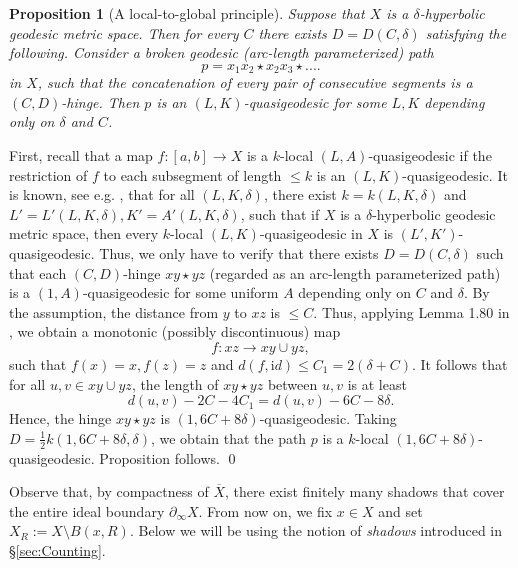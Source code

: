 \documentclass[12pt]{amsbook}%
\newtheorem{prop}[thm]{Proposition}
\theoremstyle{definition}
\newtheorem{defi}[thm]{Definition}
\theoremstyle{remark}
\numberwithin{section}{chapter}
\numberwithin{subsection}{section}
\numberwithin{figure}{chapter}
\def\geo{\partial_\infty}
\def\id{\mathrm id}
\def\ol{\overline}
\begin{document}
{{\begin{prop}
[A local-to-global principle]\label{P1}
Suppose that $X$ is a $\delta$-hyperbolic geodesic metric space. Then for every $C$ there exists $D=D(C,\delta)$ satisfying the following. Consider a broken geodesic (arc-length parameterized) 
path 
$$
p= x_1x_2 \star x_2 x_3 \star ....
$$
in $X$, such that the concatenation of every pair of consecutive segments is a $(C,D)$-hinge. Then $p$ is an $(L, K)$-quasigeodesic for some $L, K$ depending only on $\delta$ and $C$. 
\end{prop}
\proof First, recall that a map $f: [a,b]\to X$ is a $k$-local $(L,A)$-quasigeodesic if the restriction of $f$ to each subsegment of length $\leqslant k$ is an $(L,K)$-quasigeodesic. It is known, see e.g. \cite{CDP}, that for all $(L,K, \delta)$, there exist $k=k(L,K,\delta)$ and $L'=L'(L,K,\delta), K'=A'(L,K,\delta)$, such that if $X$ is a $\delta$-hyperbolic geodesic metric space, then every $k$-local $(L,K)$-quasigeodesic in $X$ is $(L',K')$-quasigeodesic. Thus, we only have to verify that there exists $D=D(C,\delta)$ such that each $(C,D)$-hinge $xy\star yz$ (regarded as an arc-length parameterized path) is a $(1,A)$-quasigeodesic for some uniform $A$ depending only on $C$ and $\delta$. By the assumption, the distance from $y$ to $xz$ is $\leqslant C$. Thus, applying Lemma 1.80 in \cite{Kapovich-Sardar}, we obtain a monotonic (possibly discontinuous) map 
$$
f: xz\to xy\cup yz, 
$$
such that $f(x)=x, f(z)=z$ and $d(f, \id)\leqslant C_1=2(\delta+C)$. It follows that for all $u, v\in xy\cup yz$, the length of 
$xy\star yz$ between $u, v$ is at least
$$
d(u,v)-2C -4C_1= d(u,v) - 6C -8\delta. 
$$ 
Hence, the hinge $xy\star yz$ is $(1, 6C +8\delta)$-quasigeodesic. Taking $D=\frac{1}{2}k(1, 6C +8\delta, \delta)$, we obtain that the path $p$ is a $k$-local $(1, 6C +8\delta)$-quasigeodesic. Proposition follows. \qed 



 
  Observe that, by compactness of $\ol{X}$, there exist finitely many shadows that cover the entire ideal boundary $\geo X$. From now on, we fix $x\in X$ and set  $X_R:= X\setminus B(x,R)$. Below we will be using the notion of {\em shadows} introduced in \S \ref{sec:Counting}. 



}}
\end{document}
